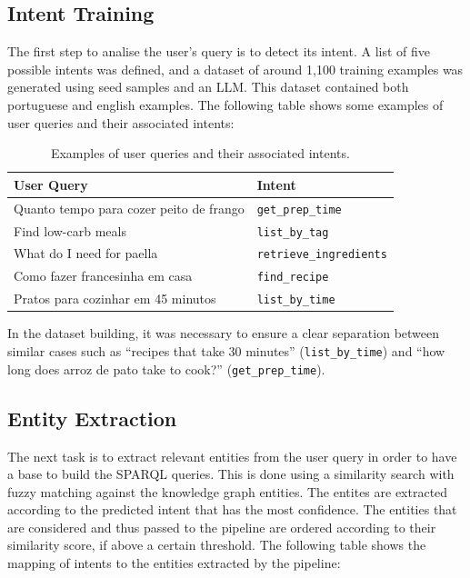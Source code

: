 \documentclass[conference]{IEEEtran}
\begin{document}
\subsection{Intent Training}

\noindent
The first step to analise the user's query is to detect its intent. A list of five possible intents was defined, and a dataset of around 1,100 training examples was generated using seed samples and an LLM. This dataset contained both portuguese and english examples. The following table shows some examples of user queries and their associated intents:


\begin{table}[h!]
\centering
\caption{Examples of user queries and their associated intents.}
\label{tab:intent-examples}
\begin{tabularx}{\columnwidth}{@{} l @{\hspace{1.5em}} Y @{}}
\toprule
\textbf{User Query} & \textbf{Intent} \\
\midrule
Quanto tempo para cozer peito de frango & \texttt{get\_prep\_time} \\
Find low-carb meals & \texttt{list\_by\_tag} \\
What do I need for paella & \texttt{retrieve\_ingredients} \\
Como fazer francesinha em casa & \texttt{find\_recipe} \\
Pratos para cozinhar em 45 minutos & \texttt{list\_by\_time} \\
\bottomrule
\end{tabularx}
\end{table}

In the dataset building, it was necessary to ensure a clear separation between similar cases such as ``recipes that take 30 minutes'' (\texttt{list\_by\_time}) and ``how long does arroz de pato take to cook?'' (\texttt{get\_prep\_time}).


\subsection{Entity Extraction}
\noindent
The next task is to extract relevant entities from the user query in order to have a base to build the SPARQL queries. This is done using a similarity search with fuzzy matching against the knowledge graph entities. The entites are extracted according to the predicted intent that has the most confidence. The entities that are considered and thus passed to the pipeline are ordered according to their similarity score, if above a certain threshold. The following table shows the mapping of intents to the entities extracted by the pipeline:
\end{document}
